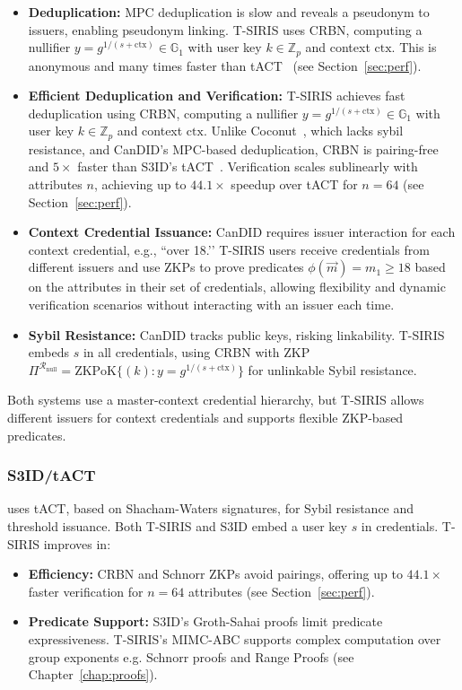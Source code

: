 \begin{itemize}
    \item \textbf{Deduplication:} MPC deduplication is slow and reveals a pseudonym to issuers, enabling pseudonym linking. T-SIRIS uses CRBN, computing a nullifier $y = g^{1/(s + \text{ctx})} \in \mathbb{G}_1$ with user key $k \in \mathbb{Z}_p$ and context $\text{ctx}$. This is anonymous and many times faster than tACT~\cite{rabaninejad_attribute-based_2024} (see Section~\ref{sec:perf}).

    \item \textbf{Efficient Deduplication and Verification:} T-SIRIS achieves fast deduplication using CRBN, computing a nullifier $y = g^{1/(s + \text{ctx})} \in \mathbb{G}_1$ with user key $k \in \mathbb{Z}_p$ and context $\text{ctx}$. Unlike Coconut~\cite{sonnino_coconut_2020}, which lacks sybil resistance, and CanDID’s MPC-based deduplication, CRBN is pairing-free and $5\times$ faster than S3ID’s tACT~\cite{rabaninejad_attribute-based_2024}. Verification scales sublinearly with attributes $n$, achieving up to $44.1\times$ speedup over tACT for $n=64$ (see Section~\ref{sec:perf}).
    
    \item \textbf{Context Credential Issuance:} CanDID requires issuer interaction for each context credential, e.g., ``over 18.’’ T-SIRIS users receive credentials from different issuers and use ZKPs to prove predicates $\phi(\vec{m}) = m_1 \geq 18$ based on the attributes in their set of credentials, allowing flexibility and dynamic verification scenarios without interacting with an issuer each time. 
    
    \item \textbf{Sybil Resistance:} CanDID tracks public keys, risking linkability. T-SIRIS embeds $s$ in all credentials, using CRBN with ZKP $\Pi^{\mathcal{R}_{\text{null}}} = \text{ZKPoK}\{(k): y = g^{1/(s + \text{ctx})}\}$ for unlinkable Sybil resistance.
\end{itemize}

Both systems use a master-context credential hierarchy, but T-SIRIS allows different issuers for context credentials and supports flexible ZKP-based predicates.

\subsubsection*{S3ID/tACT} \cite{rabaninejad_attribute-based_2024} uses tACT, based on Shacham-Waters signatures, for Sybil resistance and threshold issuance. Both T-SIRIS and S3ID embed a user key $s$ in credentials. T-SIRIS improves in:
\begin{itemize}
    \item \textbf{Efficiency:} CRBN and Schnorr ZKPs avoid pairings, offering up to $44.1\times$ faster verification for $n=64$ attributes (see Section~\ref{sec:perf}).
    \item \textbf{Predicate Support:} S3ID’s Groth-Sahai proofs limit predicate expressiveness. T-SIRIS’s MIMC-ABC supports complex computation over group exponents e.g. Schnorr proofs and Range Proofs (see Chapter~\ref{chap:proofs}).
\end{itemize}


